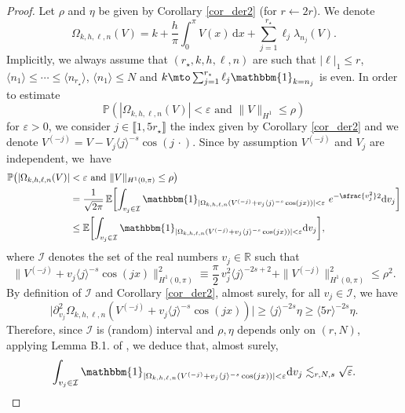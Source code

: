 \begin{proof} Let $\rho$ and $\eta$ be given by Corollary \ref{cor_der2} (for $r\leftarrow 2r$). We denote
\[
\Omega_{k,h,\ell,n}(V)=k+\frac{h}\pi \int_0^\pi V(x) \, \mathrm{d}x + \sum_{j=1}^{r_\star} \ell_j \lambda_{n_j}(V).
\]
Implicitly, we always assume that $(r_\star,k,h,\ell,n)$ are such that $|\ell|_1 \!\leq\! r$, $\langle n_1 \rangle \!\leq\! \cdots \!\leq\! \langle n_{r_\star} \rangle$, $\langle n_1 \rangle \!\leq\! N$ and $ k \mto \sum_{j=1}^{r_\star} \ell_j \mathbbm{1}_{ k = n_j } $ is even. In order to estimate
\[
\mathbb{P}(|\Omega_{k,h,\ell,n}(V)| < \varepsilon \text{ and } \|V\|_{H^1} \!\leq\! \rho)
\]
for $\varepsilon>0$, we consider $j\in \llbracket 1,5r_\star \rrbracket$ the index given by Corollary \ref{cor_der2} and we denote $V^{(-j)}=V - V_j \langle j\rangle^{-s} \cos(j \, \cdot)$. Since by assumption $V^{(-j)}$ and $V_j$ are independent, we~have
\begin{equation}
\label{eq_J_reviendrai_2}
\begin{split}
\mathbb{P}\big(|\Omega_{k,h,\ell,n}(V)| &< \varepsilon \ \text{and} \ \| V\|_{H^1(0,\pi)} \leq \rho \big) \\
&= \frac1{\sqrt{2\pi}}\,\mathbb{E} \biggl[\int_{v_{j} \in \mathcal{I}} \mathbbm{1}_{|\Omega_{k,h,\ell,n}(V^{(-j)}+ v_{j} \langle j \rangle^{-s} \cos(jx))| < \varepsilon } \ e^{-\sfrac{v_{j}^2}2}\mathrm{d}v_{j} \biggr] \\
&\leq \mathbb{E} \biggl[\int_{v_{j} \in \mathcal{I}} \mathbbm{1}_{|\Omega_{k,h,\ell,n}(V^{(-j)}+ v_{j} \langle j \rangle^{-s} \cos(jx))| < \varepsilon } \mathrm{d}v_{j} \biggr],
\end{split}
\end{equation}
where $\mathcal{I}$ denotes the set of the real numbers $v_j \in \mathbb{R}$ such that
\[
\bigl\| V^{(-j)}+ v_{j} \langle j \rangle^{-s} \cos(jx) \|_{H^1(0,\pi)}^2 \equiv \frac{\pi}2\, v_{j}^2 \langle j \rangle^{-2s+2} + \| V^{(-j)}\bigr\|_{H^1(0,\pi)}^2 \leq \rho^2.
\]
By definition of $\mathcal{I}$ and Corollary \ref{cor_der2}, almost surely, for all $v_j \in \mathcal{I}$, we have
\[
\bigl|\partial_{v_j}^2 \Omega_{k,h,\ell,n}(V^{(-j)}+ v_{j} \langle j \rangle^{-s} \cos(jx))\bigr| \geq \langle j \rangle^{-2s} \eta \geq \langle 5r \rangle^{-2s} \eta.
\]
Therefore, since $\mathcal{I}$ is (random) interval and $\rho,\eta$ depends only on $(r,N)$, applying Lemma B.1. of \cite{Eli}, we deduce that, almost surely,
\[
\int_{v_{j} \in \mathcal{I}} \mathbbm{1}_{|\Omega_{k,h,\ell,n}(V^{(-j)}+ v_{j} \langle j \rangle^{-s} \cos(jx))| < \varepsilon } \mathrm{d}v_{j} \lesssim_{r,N,s} \sqrt{\varepsilon}.
\]
\end{proof}
